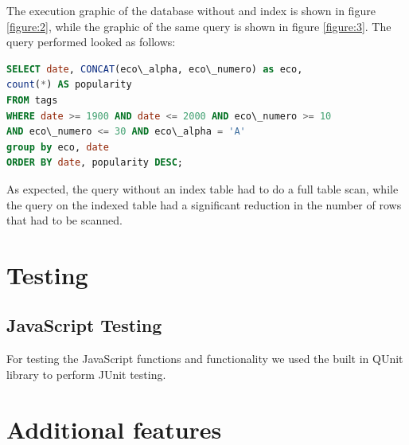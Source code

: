 \documentclass{article}
\begin{document}
The execution graphic of the database without and index is shown in figure
\ref{figure:2}, while the graphic of the same query is shown in figure
\ref{figure:3}. The query performed looked as follows:

\begin{lstlisting}[language=sql, frame=single]
SELECT date, CONCAT(eco\_alpha, eco\_numero) as eco,
count(*) AS popularity
FROM tags
WHERE date >= 1900 AND date <= 2000 AND eco\_numero >= 10
AND eco\_numero <= 30 AND eco\_alpha = 'A'
group by eco, date
ORDER BY date, popularity DESC;
\end{lstlisting}

As expected, the query without an index table had to do a full table scan,
while the query on the indexed table had a significant reduction in the
number of rows that had to be scanned.

\section{Testing}
\subsection{JavaScript Testing}
For testing the JavaScript functions and functionality we used the built
in QUnit library to perform JUnit testing.

\section{Additional features}



\end{document}
